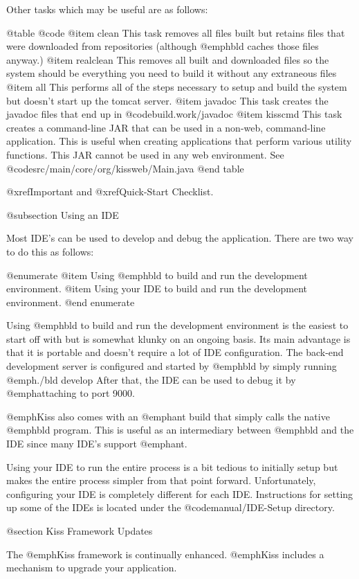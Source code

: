 Other tasks which may be useful are as follows:

@table @code
@item clean
This task removes all files built but retains files that were downloaded from
repositories (although @emph{bld} caches those files anyway.)
@item realclean
This removes all built and downloaded files so the system should be everything
you need to build it without any extraneous files
@item all
This performs all of the steps necessary to setup and build the system but
doesn't start up the tomcat server.
@item javadoc
This task creates the javadoc files that end up in @code{build.work/javadoc}
@item kisscmd
This task creates a command-line JAR that can be used in a non-web, command-line application.
This is useful when creating applications that perform various utility functions.  This
JAR cannot be used in any web environment.  See @code{src/main/core/org/kissweb/Main.java}
@end table

@xref{Important} and @xref{Quick-Start Checklist}.

@subsection Using an IDE

Most IDE's can be used to develop and debug the application.  There are two
way to do this as follows:

@enumerate
@item
Using @emph{bld} to build and run the development environment.
@item
Using your IDE to build and run the development environment.
@end enumerate

Using @emph{bld} to build and run the development environment is the
easiest to start off with but is somewhat klunky on an ongoing basis.
Its main advantage is that it is portable and doesn't require a lot of
IDE configuration.  The back-end development server is configured and
started by @emph{bld} by simply running @emph{./bld develop} After
that, the IDE can be used to debug it by @emph{attaching} to port
9000.

@emph{Kiss} also comes with an @emph{ant} build that simply calls the
native @emph{bld} program.  This is useful as an intermediary between
@emph{bld} and the IDE since many IDE's support @emph{ant}.

Using your IDE to run the entire process is a bit tedious to initially
setup but makes the entire process simpler from that point forward.
Unfortunately, configuring your IDE is completely different for each
IDE.  Instructions for setting up some of the IDEs is located under the
@code{manual/IDE-Setup} directory.


@section Kiss Framework Updates

The @emph{Kiss} framework is continually enhanced.  @emph{Kiss}
includes a mechanism to upgrade your application. 

